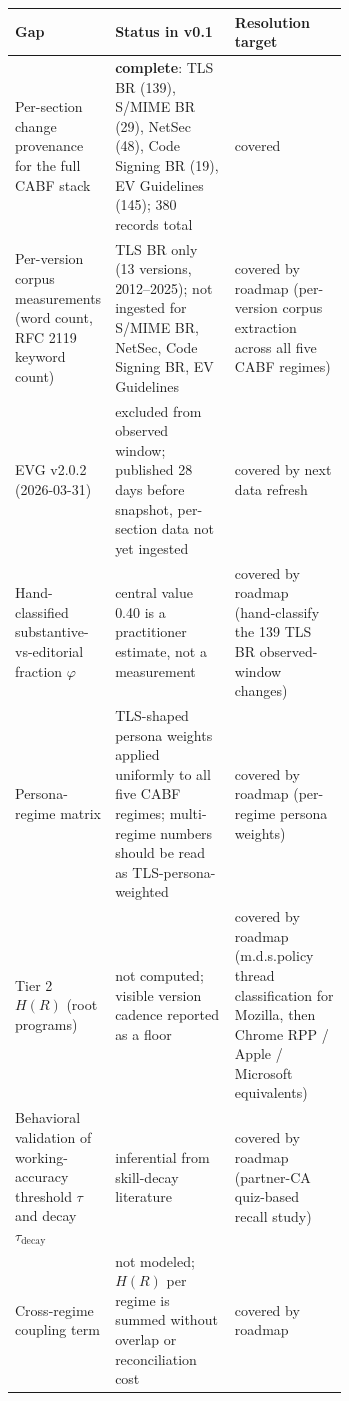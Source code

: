 \documentclass[11pt,letterpaper]{article}
\begin{document}
\begin{tcolorbox}
\vspace{0.4em}
{\footnotesize
\begin{tabularx}{\linewidth}{@{}p{0.30\linewidth} p{0.36\linewidth} X@{}}
\toprule
\textbf{Gap} & \textbf{Status in v0.1} & \textbf{Resolution target} \\
\midrule
Per-section change provenance for the full CABF stack & \textbf{complete}: TLS BR (139), S/MIME BR (29), NetSec (48), Code Signing BR (19), EV Guidelines (145); 380 records total & covered \\[1pt]
Per-version corpus measurements (word count, RFC 2119 keyword count) & TLS BR only (13 versions, 2012--2025); not ingested for S/MIME BR, NetSec, Code Signing BR, EV Guidelines & covered by roadmap (per-version corpus extraction across all five CABF regimes) \\[1pt]
EVG v2.0.2 (2026-03-31) & excluded from observed window; published 28 days before snapshot, per-section data not yet ingested & covered by next data refresh \\[1pt]
Hand-classified substantive-vs-editorial fraction $\varphi$ & central value 0.40 is a practitioner estimate, not a measurement & covered by roadmap (hand-classify the 139 TLS BR observed-window changes) \\[1pt]
Persona-regime matrix & TLS-shaped persona weights applied uniformly to all five CABF regimes; multi-regime numbers should be read as TLS-persona-weighted & covered by roadmap (per-regime persona weights) \\[1pt]
Tier 2 $H(R)$ (root programs) & not computed; visible version cadence reported as a floor & covered by roadmap (m.d.s.policy thread classification for Mozilla, then Chrome RPP / Apple / Microsoft equivalents) \\[1pt]
Behavioral validation of working-accuracy threshold $\tau$ and decay $\tau_{\text{decay}}$ & inferential from skill-decay literature & covered by roadmap (partner-CA quiz-based recall study) \\[1pt]
Cross-regime coupling term & not modeled; $H(R)$ per regime is summed without overlap or reconciliation cost & covered by roadmap \\
\bottomrule
\end{tabularx}
}
\end{tcolorbox}
\end{document}
